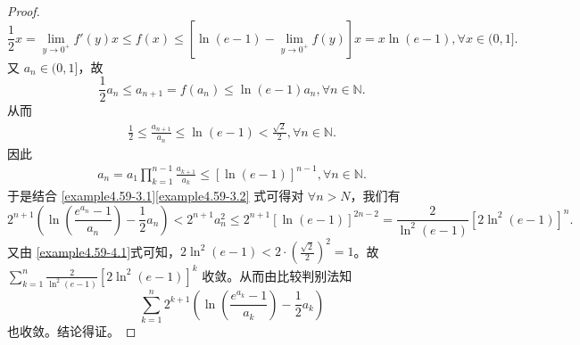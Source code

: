 \documentclass[../../main.tex]{subfiles}%
\begin{document}
\begin{proof}
\[
\frac{1}{2} x = \lim_{y \to 0^+} f'(y) x \leqslant  f(x) \leqslant  [\ln(e - 1) - \lim_{y \to 0^+} f(y)] x = x \ln(e - 1),\forall x \in (0, 1].
\]
又 \(a_n \in (0, 1]\)，故
\[
\frac{1}{2} a_n \leqslant  a_{n + 1} = f(a_n) \leqslant  \ln(e - 1) a_n,\forall n \in \mathbb{N}.
\]
从而
\begin{align}
\frac{1}{2} \leqslant  \frac{a_{n + 1}}{a_n} \leqslant  \ln(e - 1) < \frac{\sqrt{2}}{2},\forall n \in \mathbb{N}. \label{example4.59-4.1} 
\end{align}
因此
\begin{align}
a_n = a_1 \prod_{k = 1}^{n - 1} \frac{a_{k + 1}}{a_k} \leqslant  [\ln(e - 1)]^{n - 1},\forall n \in \mathbb{N}. \label{example4.59-3.2}
\end{align}
于是结合 \eqref{example4.59-3.1}\eqref{example4.59-3.2} 式可得对 \(\forall n > N\)，我们有
\[
2^{n + 1}\left(\ln\left(\frac{e^{a_n} - 1}{a_n}\right) - \frac{1}{2} a_n\right) < 2^{n + 1} a_n^2 \leqslant  2^{n + 1}[\ln(e - 1)]^{2n - 2} = \frac{2}{\ln^2(e - 1)}[2\ln^2(e - 1)]^n.
\]
又由 \eqref{example4.59-4.1}式可知，\(2\ln^2(e - 1) < 2\cdot\left(\frac{\sqrt{2}}{2}\right)^2 = 1\)。故 \(\sum_{k = 1}^n \frac{2}{\ln^2(e - 1)}[2\ln^2(e - 1)]^k\) 收敛。从而由比较判别法知$$\sum_{k = 1}^n 2^{k + 1}\left(\ln\left(\frac{e^{a_k} - 1}{a_k}\right)- \frac{1}{2} a_k\right)$$也收敛。结论得证。

\end{proof}
\end{document}
